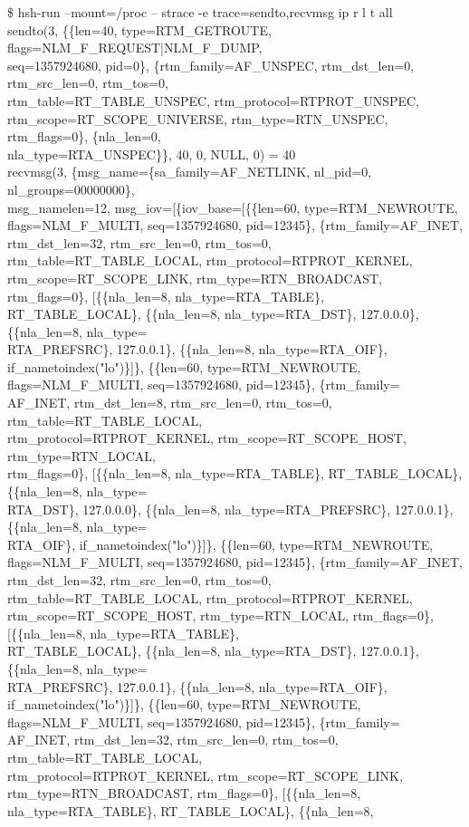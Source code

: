{\texttt\tiny
\$ hsh-run --mount=/proc -- strace -e trace=sendto,recvmsg ip r l t all \\
\fontsize{4pt}{4pt}\selectfont
sendto(3, \{\{len=40, type=RTM\_GETROUTE, flags=NLM\_F\_REQUEST|NLM\_F\_DUMP, \\seq=1357924680, pid=0\}, \{rtm\_family=AF\_UNSPEC, rtm\_dst\_len=0, rtm\_src\_len=0, rtm\_tos=0,\\ rtm\_table=RT\_TABLE\_UNSPEC, rtm\_protocol=RTPROT\_UNSPEC, \\rtm\_scope=RT\_SCOPE\_UNIVERSE, rtm\_type=RTN\_UNSPEC, rtm\_flags=0\}, \{nla\_len=0, \\nla\_type=RTA\_UNSPEC\}\}, 40, 0, NULL, 0) = 40 \\
recvmsg(3, \{msg\_name=\{sa\_family=AF\_NETLINK, nl\_pid=0, nl\_groups=00000000\}, \\msg\_namelen=12, msg\_iov=[\{iov\_base=[\{\{len=60, type=RTM\_NEWROUTE, flags=NLM\_F\_MULTI, seq=1357924680, pid=12345\}, \{rtm\_family=AF\_INET, rtm\_dst\_len=32, rtm\_src\_len=0, rtm\_tos=0, rtm\_table=RT\_TABLE\_LOCAL, rtm\_protocol=RTPROT\_KERNEL, rtm\_scope=RT\_SCOPE\_LINK, rtm\_type=RTN\_BROADCAST, rtm\_flags=0\}, [\{\{nla\_len=8, nla\_type=RTA\_TABLE\}, \\RT\_TABLE\_LOCAL\}, \{\{nla\_len=8, nla\_type=RTA\_DST\}, 127.0.0.0\}, \{\{nla\_len=8, nla\_type=\\RTA\_PREFSRC\}, 127.0.0.1\}, \{\{nla\_len=8, nla\_type=RTA\_OIF\}, if\_nametoindex("lo")\}]\}, \{\{len=60, type=RTM\_NEWROUTE, flags=NLM\_F\_MULTI, seq=1357924680, pid=12345\}, \{rtm\_family=\\AF\_INET, rtm\_dst\_len=8, rtm\_src\_len=0, rtm\_tos=0, rtm\_table=RT\_TABLE\_LOCAL, \\rtm\_protocol=RTPROT\_KERNEL, rtm\_scope=RT\_SCOPE\_HOST, rtm\_type=RTN\_LOCAL, \\rtm\_flags=0\}, [\{\{nla\_len=8, nla\_type=RTA\_TABLE\}, RT\_TABLE\_LOCAL\}, \{\{nla\_len=8, nla\_type=\\RTA\_DST\}, 127.0.0.0\}, \{\{nla\_len=8, nla\_type=RTA\_PREFSRC\}, 127.0.0.1\}, \{\{nla\_len=8, nla\_type=\\RTA\_OIF\}, if\_nametoindex("lo")\}]\}, \{\{len=60, type=RTM\_NEWROUTE, flags=NLM\_F\_MULTI, seq=1357924680, pid=12345\}, \{rtm\_family=AF\_INET, rtm\_dst\_len=32, rtm\_src\_len=0, rtm\_tos=0, rtm\_table=RT\_TABLE\_LOCAL, rtm\_protocol=RTPROT\_KERNEL, rtm\_scope=RT\_SCOPE\_HOST, rtm\_type=RTN\_LOCAL, rtm\_flags=0\}, [\{\{nla\_len=8, nla\_type=RTA\_TABLE\}, \\RT\_TABLE\_LOCAL\}, \{\{nla\_len=8, nla\_type=RTA\_DST\}, 127.0.0.1\}, \{\{nla\_len=8, nla\_type=\\RTA\_PREFSRC\}, 127.0.0.1\}, \{\{nla\_len=8, nla\_type=RTA\_OIF\}, if\_nametoindex("lo")\}]\}, \{\{len=60, type=RTM\_NEWROUTE, flags=NLM\_F\_MULTI, seq=1357924680, pid=12345\}, \{rtm\_family=\\AF\_INET, rtm\_dst\_len=32, rtm\_src\_len=0, rtm\_tos=0, rtm\_table=RT\_TABLE\_LOCAL, \\rtm\_protocol=RTPROT\_KERNEL, rtm\_scope=RT\_SCOPE\_LINK, rtm\_type=RTN\_BROADCAST, rtm\_flags=0\}, [\{\{nla\_len=8, nla\_type=RTA\_TABLE\}, RT\_TABLE\_LOCAL\}, \{\{nla\_len=8, }
